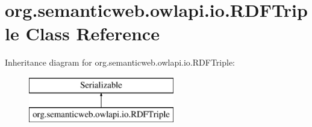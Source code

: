 \hypertarget{classorg_1_1semanticweb_1_1owlapi_1_1io_1_1_r_d_f_triple}{\section{org.\-semanticweb.\-owlapi.\-io.\-R\-D\-F\-Triple Class Reference}
\label{classorg_1_1semanticweb_1_1owlapi_1_1io_1_1_r_d_f_triple}
}
Inheritance diagram for org.\-semanticweb.\-owlapi.\-io.\-R\-D\-F\-Triple\-:\begin{figure}[H]
\begin{center}
\leavevmode
\includegraphics[height=2.000000cm]{classorg_1_1semanticweb_1_1owlapi_1_1io_1_1_r_d_f_triple}
\end{center}
\end{figure}
